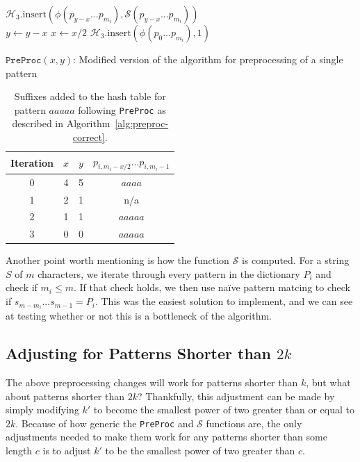 \documentclass[ %
                    author={Dominic Joseph Moylett},
                    degree={MEng},
                     title={Dictionary Matching with Fingerprints},
                  subtitle={An Empirical Analysis},
                      type={research},
                      year={2015} ]{dissertation}
\begin{document}
\begin{algorithm}[t]
 {
   {
    $\mathcal{H}_3.\text{insert}(\phi(p_{y-x}...p_{m_i}), \mathcal{S}(p_{y-x}...p_{m_i}))$\\
    $y \gets y - x$
  }
  $x \gets x/2$
}
$\mathcal{H}_3.\text{insert}(\phi(p_0...p_{m_i}), 1)$
\caption{$\texttt{PreProc}(x,y)$: Modified version of the algorithm for preprocessing of a single pattern}
\label{alg:preproc-correct}
\end{algorithm}

\begin{table}[t]
  \centering
  \begin{tabular}{|c|c|c|c|}
    \hline
    Iteration & $x$ & $y$ & $p_{i, m_i-x/2}...p_{i, m_i - 1}$ \\\hline
    0 & 4 & 5 & $aaaa$ \\\hline
    1 & 2 & 1 & n/a \\\hline
    2 & 1 & 1 & $aaaaa$ \\\hline
    3 & 0 & 0 & $aaaaa$ \\\hline
  \end{tabular}
  \caption{Suffixes added to the hash table for pattern $aaaaa$ following \texttt{PreProc} as described in Algorithm~\ref{alg:preproc-correct}.}
  \label{tab:preproc-results-correct}
\end{table}

Another point worth mentioning is how the function $\mathcal{S}$ is computed. For a string $S$ of $m$ characters, we iterate through every pattern in the dictionary $P_i$ and check if $m_i \leq m$. If that check holds, we then use na\"{i}ve pattern matcing to check if $s_{m - m_i}...s_{m - 1} = P_i$. This was the easiest solution to implement, and we can see at testing whether or not this is a bottleneck of the algorithm.

\subsection{Adjusting for Patterns Shorter than $2k$}

The above preprocessing changes will work for patterns shorter than $k$, but what about patterns shorter than $2k$? Thankfully, this adjustment can be made by simply modifying $k'$ to become the smallest power of two greater than or equal to $2k$. Because of how generic the \texttt{PreProc} and $\mathcal{S}$ functions are, the only adjustments needed to make them work for any patterns shorter than some length $c$ is to adjust $k'$ to be the smallest power of two greater than $c$.
\end{document}
